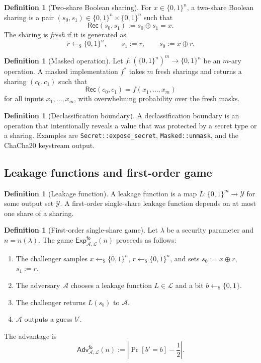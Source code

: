 \documentclass[11pt,a4paper]{article}
\newcommand{\bits}{\{0,1\}}
\newcommand{\Rec}{\mathsf{Rec}}
\newcommand{\code}[1]{\texttt{#1}}
\newcommand{\Adv}{\mathcal{A}}
\newcommand{\Prb}{\Pr}
\theoremstyle{plain}
\theoremstyle{definition}
\newtheorem{definition}[theorem]{Definition}
\theoremstyle{remark}
\begin{document}
\begin{definition}[Two-share Boolean sharing]\label{def:sharing}
For \(x\in\bits^n\), a two-share Boolean sharing is a pair
\((s_0,s_1)\in\bits^n\times\bits^n\) such that
\[
  \Rec(s_0,s_1) := s_0\oplus s_1 = x.
\]
The sharing is \emph{fresh} if it is generated as
\[
  r\gets_{\$}\bits^n,\qquad s_1:=r,\qquad s_0:=x\oplus r.
\]
\end{definition}

\begin{definition}[Masked operation]\label{def:masked-op}
Let \(f:(\bits^n)^m\to\bits^n\) be an \(m\)-ary operation. A masked implementation
\(f^\ast\) takes \(m\) fresh sharings and returns a sharing
\((c_0,c_1)\) such that
\[
  \Rec(c_0,c_1) = f(x_1,\ldots,x_m)
\]
for all inputs \(x_1,\ldots,x_m\), with overwhelming probability over the fresh masks.
\end{definition}

\begin{definition}[Declassification boundary]\label{def:declass}
A declassification boundary is an operation that intentionally reveals a value that
was protected by a secret type or a sharing. Examples are \code{Secret::expose\_secret},
\code{Masked::unmask}, and the ChaCha20 keystream output.
\end{definition}

\subsection{Leakage functions and first-order game}

\begin{definition}[Leakage function]\label{def:leakage}
A leakage function is a map \(L:\bits^m\to\mathcal{Y}\) for some output set
\(\mathcal{Y}\). A first-order single-share leakage function depends on at most one
share of a sharing.
\end{definition}

\begin{definition}[First-order single-share game]\label{def:game}
Let \(\lambda\) be a security parameter and \(n=n(\lambda)\). The game
\(\mathsf{Exp}^{\mathsf{fo}}_{\Adv,\mathcal{L}}(n)\) proceeds as follows:
\begin{enumerate}[leftmargin=1.5em]
  \item The challenger samples \(x\gets_{\$}\bits^n\), \(r\gets_{\$}\bits^n\), and
        sets \(s_0:=x\oplus r\), \(s_1:=r\).
  \item The adversary \(\Adv\) chooses a leakage function
        \(L\in\mathcal{L}\) and a bit \(b\gets_{\$}\bits\).
  \item The challenger returns \(L(s_b)\) to \(\Adv\).
  \item \(\Adv\) outputs a guess \(b'\).
\end{enumerate}
The advantage is
\[
  \mathsf{Adv}^{\mathsf{fo}}_{\Adv,\mathcal{L}}(n)
  := \left|\Prb[b'=b]-\frac{1}{2}\right|.
\]
\end{definition}
\end{document}
